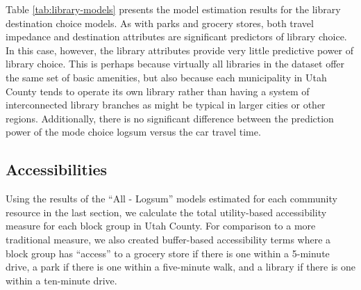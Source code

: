 \documentclass[3p, authoryear]{elsarticle} %
\begin{document}
\begin{table}

\caption{\label{tab:library-models}Library Destination Choice Utilities}
\centering
{}
\end{table}

Table \ref{tab:library-models} presents the model estimation results for the
library destination choice models. As with parks and grocery stores, both
travel impedance and destination attributes are significant predictors of
library choice. In this case, however, the library attributes provide very little
predictive power of library choice. This is perhaps because virtually all
libraries in the dataset offer the same set of basic amenities, but also because
each municipality in Utah County tends to operate its own library rather than
having a system of interconnected library branches as might be typical in
larger cities or other regions. Additionally, there is no significant difference
between the prediction power of the mode choice logsum versus the car travel
time.

\hypertarget{accessibilities}{%
\subsection{Accessibilities}\label{accessibilities}}

Using the results of the ``All - Logsum'' models estimated for each community resource
in the last section, we calculate the total utility-based accessibility measure
for each block group in Utah County. For comparison to a more traditional measure,
we also created buffer-based accessibility terms where a block group has
``access'' to a grocery store if there is one within a 5-minute drive, a
park if there is one within a five-minute walk, and a library if there is one within
a ten-minute drive.
\end{document}
